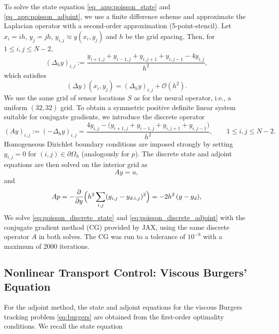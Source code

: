 \documentclass[final,1p,times]{elsarticle}
\theoremstyle{plain} %
\theoremstyle{definition} %
\theoremstyle{remark} %
\begin{document}
To solve the state equation \eqref{eq_app:poisson_state} and \eqref{eq_app:poisson_adjoint}, we use a finite difference scheme and approximate the Laplacian operator with a second-order approximation (5-point-stencil). Let $x_i = ih$, $y_j = jh$, $y_{i,j} \approx y(x_i,y_j)$ and $h$ be the grid spacing. Then, for $1\le i,j \le N-2$,
\begin{equation}\label{eq:laplacian_5pt}
(\Delta_h y)_{i,j}
:= \frac{y_{i+1,j} + y_{i-1,j} + y_{i,j+1} + y_{i,j-1} - 4y_{i,j}}{h^2},
\end{equation}
which satisfies
\begin{equation}\label{eq:laplacian_5pt_error}
(\Delta y)(x_i,y_j) = (\Delta_h y)_{i,j} + \mathcal{O}(h^2).
\end{equation}
We use the same grid of sensor locations $S$ as for the neural operator, i.e., a uniform $(32,32)$ grid. To obtain a symmetric positive definite linear system suitable for conjugate gradients, we introduce the discrete operator
\begin{equation}\label{eq:poisson_discrete_operator}
(Ay)_{i,j} := (-\Delta_h y)_{i,j}
= \frac{4y_{i,j} - \bigl(y_{i+1,j}+y_{i-1,j}+y_{i,j+1}+y_{i,j-1}\bigr)}{h^2},
\qquad 1\le i,j \le N-2 .
\end{equation}
Homogeneous Dirichlet boundary conditions are imposed strongly by setting $y_{i,j}=0$ for $(i,j)\in\partial\Omega_h$ (analogously for $p$).
The discrete state and adjoint equations are then solved on the interior grid as
\begin{equation}\label{eq:poisson_discrete_state}
A y = u, 
\end{equation}
and
\begin{equation}\label{eq:poisson_discrete_adjoint}
A p = -\frac{\partial}{\partial y}\Bigl(h^2\sum_{i,j}(y_{i,j}-y_{d,i,j})^2\Bigr)
= -2h^2\,(y-y_d),
\end{equation}
We solve \eqref{eq:poisson_discrete_state} and \eqref{eq:poisson_discrete_adjoint} with the conjugate gradient method (CG) provided by JAX, using the same discrete operator $A$ in both solves. The CG was run to a tolerance of $10^{-8}$ with a maximum of 2000 iterations. 
\subsection{Nonlinear Transport Control: Viscous Burgers' Equation}

For the adjoint method, the state and adjoint equations for the viscous Burgers tracking problem
\eqref{eq:burgers} are obtained from the first-order optimality conditions. We recall the state equation
\end{document}
